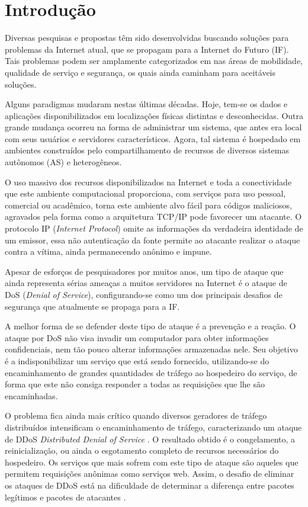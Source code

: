 \documentclass[a4paper, 12pt]{article}
\begin{document}
\section{Introdução}


Diversas pesquisas e propostas têm sido desenvolvidas buscando soluções para problemas da Internet atual, que se propagam para a Internet do Futuro (IF). Tais problemas podem ser amplamente categorizados em nas áreas de mobilidade, qualidade de serviço e segurança, os quais ainda caminham para aceitáveis soluções.

Alguns paradigmas mudaram nestas últimas décadas. Hoje, tem-se os dados e aplicações disponibilizados em localizações físicas distintas e desconhecidas. Outra grande mudança ocorreu na forma de administrar um sistema, que antes era local com seus usuários e servidores característicos. Agora, tal sistema é hospedado em ambientes construídos pelo compartilhamento de recursos de diversos sistemas autônomos (AS) e heterogêneos.

O uso massivo dos recursos disponibilizados na Internet e toda a conectividade que este ambiente computacional proporciona, com serviços para uso pessoal, comercial ou acadêmico, torna este ambiente alvo fácil para códigos maliciosos, agravados pela forma como a arquitetura TCP/IP pode favorecer um atacante. O protocolo IP (\emph{Internet Protocol}) omite as informações da verdadeira identidade de um emissor, essa não autenticação da fonte permite ao atacante realizar o ataque contra a vítima, ainda permanecendo anônimo e impune.

Apesar de esforços de pesquisadores por muitos anos, um tipo de ataque que ainda representa sérias ameaças a muitos servidores na Internet é o ataque de DoS (\emph{Denial of Service}), configurando-se como um dos principais desafios de segurança que atualmente se propaga para a IF. 


A melhor forma de se defender deste tipo de ataque é a prevenção e a reação. O ataque por DoS não visa invadir um computador para obter informações confidenciais, nem tão pouco alterar informações armazenadas nele. Seu objetivo é a indisponibilizar um serviço que está sendo fornecido, utilizando-se do encaminhamento de grandes quantidades de tráfego ao hospedeiro do serviço, de forma que este não consiga responder a todas as requisições que lhe são encaminhadas. 

O problema fica ainda mais crítico quando diversos geradores de tráfego distribuídos intensificam o encaminhamento de tráfego, caracterizando um ataque de DDoS \emph{Distributed Denial of Service} \cite{Sachdeva08ddosincidents}. O resultado obtido é o congelamento, a reinicialização, ou ainda o esgotamento completo de recursos necessários do hospedeiro. Os serviços que mais sofrem com este tipo de ataque são aqueles que permitem requisições anônimas como serviços web. Assim, o desafio de eliminar os ataques de DDoS está na dificuldade de determinar a diferença entre pacotes legítimos e pacotes de atacantes \cite{Li:2009:DDA:1683304.1684620}.
\end{document}
